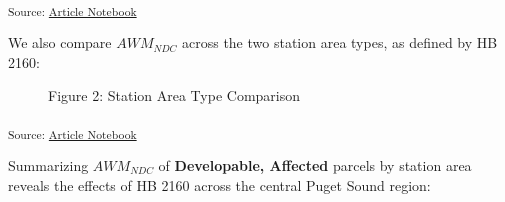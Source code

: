 \documentclass[
]{agujournal2019}
\begin{document}
\textsubscript{Source:
\href{https://tiernanmartin.github.io/2024-transit-oriented-development-bill/index.qmd.html}{Article
Notebook}}

We also compare \(AWM_{NDC}\) across the two station area types, as
defined by HB 2160:

\label{cell-fig-results-histogram-station-areas}
\begin{figure}[H]


\caption{\label{fig-results-histogram-station-areas}Figure 2: Station
Area Type Comparison}

\end{figure}%

\textsubscript{Source:
\href{https://tiernanmartin.github.io/2024-transit-oriented-development-bill/index.qmd.html}{Article
Notebook}}

Summarizing \(AWM_{NDC}\) of \textbf{Developable, Affected} parcels by
station area reveals the effects of HB 2160 across the central Puget
Sound region:
\end{document}
